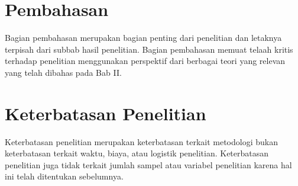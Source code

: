 \section{Pembahasan}
Bagian pembahasan merupakan bagian penting dari penelitian dan letaknya terpisah dari subbab hasil penelitian. Bagian pembahasan memuat telaah kritis terhadap penelitian menggunakan perspektif dari berbagai teori yang relevan yang telah dibahas pada Bab II.

\section{Keterbatasan Penelitian}
Keterbatasan penelitian merupakan keterbatasan terkait metodologi bukan keterbatasan terkait waktu, biaya, atau logistik penelitian. Keterbatasan penelitian juga tidak terkait jumlah sampel atau variabel penelitian karena hal ini telah ditentukan sebelumnya.